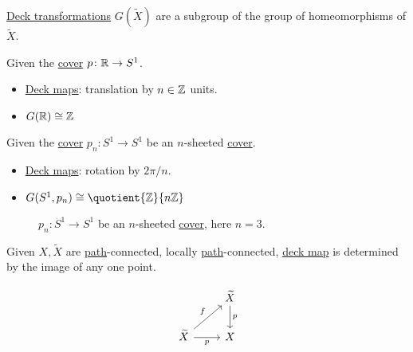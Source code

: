 \begin{eg}
	\hyperref[def:deck-transformation]{Deck transformations} \(G(\widetilde{X} )\) are a subgroup of the group of homeomorphisms of \(\widetilde{X} \).
\end{eg}

\begin{eg}
	Given the \hyperref[def:covering-map]{cover} \(p\colon \mathbb{\MakeUppercase{r}} \to S^1\).
	\begin{itemize}
		\item \hyperref[def:deck-transformation]{Deck maps}: translation by \(n\in \mathbb{\MakeUppercase{z}} \) units.
		\item \(G(\mathbb{\MakeUppercase{r}} )\cong \mathbb{\MakeUppercase{z}} \)
	\end{itemize}
\end{eg}
\begin{eg}
	Given the \hyperref[def:covering-map]{cover} \(p_{n}\colon S^{1}\to S^1\) be an \(n\)-sheeted \hyperref[def:covering-map]{cover}.
	\begin{itemize}
		\item \hyperref[def:deck-transformation]{Deck maps}: rotation by \(2\pi / n\).
		\item \(G(S^1, p_{n})\cong \quotient{\mathbb{\MakeUppercase{z}} }{n \mathbb{\MakeUppercase{z}} } \)
	\end{itemize}
	\begin{figure}[H]
		\centering
		\caption{\(p_{n} \colon S^1 \to S^1\) be an \(n\)-sheeted \hyperref[def:covering-map]{cover}, here \(n = 3\).}
		\label{fig:eg:lec17:N-sheeted-cover}
	\end{figure}
\end{eg}

\begin{exercise}\label{ex:lec17}
	Given \(X, \widetilde{X} \) are \hyperref[def:path]{path}-connected, locally \hyperref[def:path]{path}-connected,
	\hyperref[def:deck-transformation]{deck map} is determined by the image of any one point.
\end{exercise}
\begin{answer}
	\[
		\begin{tikzcd}
			& {\widetilde{X}} \\
			{\widetilde{X}} & X
			\arrow["f", from=2-1, to=1-2]
			\arrow["p"', from=2-1, to=2-2]
			\arrow["p", from=1-2, to=2-2]
		\end{tikzcd}
	\]
\end{answer}

